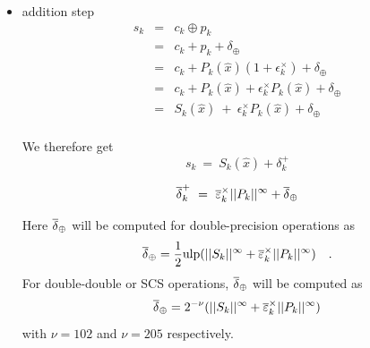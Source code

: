 \begin{itemize}
\begin{itemize}
  \item addition step 
      \begin{eqnarray*}
        s_{k} &=&  c_k \oplus p_k \\
              &=& c_k + p_k + \delta_\oplus\\
              &=&  c_k + P_k(\hat{x})(1+\epsilon^\times_k) + \delta_\oplus\\
              &=&  c_k + P_k(\hat{x}) + \epsilon^\times_k P_k(\hat{x})  + \delta_\oplus\\
              &=&  S_{k}(\hat{x})\  +\  \epsilon^\times_k P_k(\hat{x}) +  \delta_\oplus \\
      \end{eqnarray*}

    We therefore get 
      \begin{equation}
        s_{k} \ = \  S_{k}(\hat{x}) + \delta^+_k \label{eq:sk}
      \end{equation}
      
      \begin{equation}
        {\overline{\delta}}^+_k  \ = \  {\overline{\varepsilon}}^\times_k||{P_{k}}||^{\infty} + {\overline{\delta}}_\oplus\label{eq:maxdelta}
      \end{equation}
      
      Here ${\overline{\delta}}_\oplus$ will be computed for double-precision operations as 
      $${\overline{\delta}}_\oplus = \frac{1}{2}\mbox{ulp}(||{S_{k}}||^{\infty} + {\overline{\varepsilon}}^\times_k||{P_{k}}||^{\infty})\quad .$$
      For double-double or SCS operations, ${\overline{\delta}}_\oplus$ will be computed as
      $${\overline{\delta}}_\oplus=2^{-\nu}(||{S_{k}}||^{\infty} + {\overline{\varepsilon}}^\times_k||{P_{k}}||^{\infty})$$
      with $\nu=102$ and $\nu=205$ respectively.
    \end{itemize}
  \end{itemize}
  


